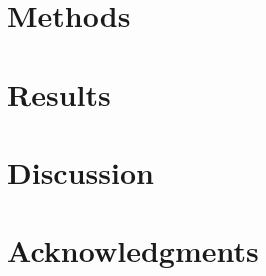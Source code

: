 \documentclass[fleqn,moreauthors,10pt]{ds_report}
\begin{document}
\section*{Methods}


\section*{Results}


\section*{Discussion}



\section*{Acknowledgments}



\end{document}
